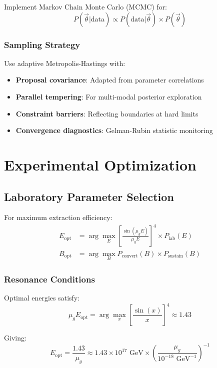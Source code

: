 \documentclass[11pt]{article}
\begin{document}
Implement Markov Chain Monte Carlo (MCMC) for:
\begin{equation}
P(\vec{\theta}|\text{data}) \propto P(\text{data}|\vec{\theta}) \times P(\vec{\theta})
\end{equation}

\subsubsection{Sampling Strategy}

Use adaptive Metropolis-Hastings with:
\begin{itemize}
    \item \textbf{Proposal covariance}: Adapted from parameter correlations
    \item \textbf{Parallel tempering}: For multi-modal posterior exploration
    \item \textbf{Constraint barriers}: Reflecting boundaries at hard limits
    \item \textbf{Convergence diagnostics}: Gelman-Rubin statistic monitoring
\end{itemize}

\section{Experimental Optimization}

\subsection{Laboratory Parameter Selection}

For maximum extraction efficiency:
\begin{align}
E_{\text{opt}} &= \arg\max_E \left[\frac{\sin(\mu_g E)}{\mu_g E}\right]^4 \times P_{\text{lab}}(E) \\
B_{\text{opt}} &= \arg\max_B P_{\text{convert}}(B) \times P_{\text{sustain}}(B)
\end{align}

\subsubsection{Resonance Conditions}

Optimal energies satisfy:
\begin{equation}
\mu_g E_{\text{opt}} = \arg\max_x \left[\frac{\sin(x)}{x}\right]^4 \approx 1.43
\end{equation}

Giving:
\begin{equation}
E_{\text{opt}} = \frac{1.43}{\mu_g} \approx 1.43 \times 10^{17} \text{ GeV} \times \left(\frac{\mu_g}{10^{-18} \text{ GeV}^{-1}}\right)^{-1}
\end{equation}
\end{document}
